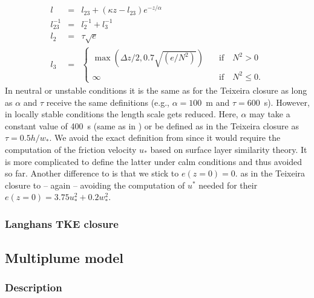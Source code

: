 \documentclass[dvipdfmx,a4paper,10pt]{article}
\begin{document}
\begin{eqnarray}
 l &=&l_{23} + (\kappa z - l_{23}) e^{-z/\alpha} \\
 l_{23}^{-1}&=&l_{2}^{-1} + l_{3}^{-1}\\
 l_{2} &=& \tau \sqrt{e}\\
 l_{3} &=& \left\{ 
 \begin{array}{ll}
  \max(\Delta z/2, 0.7 \sqrt{(e/N^2)})&\quad \mathrm{if}\quad N^2>0\\
  \infty &\quad \mathrm{if}\quad N^2\leq 0.
  \end{array}\right.
\end{eqnarray}
In neutral or unstable conditions it is the same as for the Teixeira closure as long as $\alpha$ and $\tau$ receive the same definitions (e.g., $\alpha=100$~m and $\tau=600$~s). However, in locally stable conditions the length scale gets reduced. Here, $\alpha$ may take a constant value of 400~s (same as in \cite{suselj13}) or be defined as in the Teixeira closure as $\tau=0.5 h/w_*$. We avoid the exact definition from \cite{witek11} since it would require the computation of the friction velocity $u_*$ based on surface layer similarity theory. It is more complicated to define the latter under calm conditions and thus avoided so far. Another difference to \cite{witek11} is that we stick to $e(z=0)=0.$ as in the Teixeira closure to -- again -- avoiding the computation of $u^*$ needed for their $e(z=0)=3.75 u_*^2+0.2w_*^2$. 

\subsubsection{Langhans TKE closure}

\subsection{Multiplume model}

\subsubsection{Description}
\end{document}
